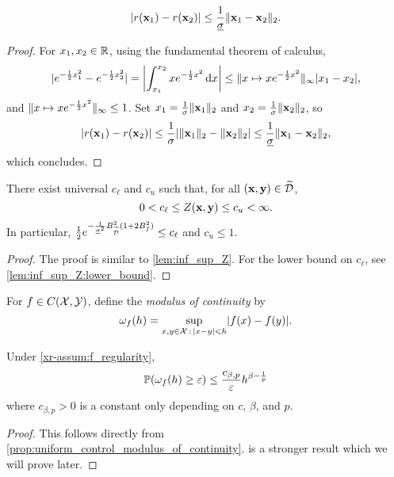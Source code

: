 \documentclass[12pt, twoside]{report}
\newcommand{\xrprefix}[1]{xr-#1}
\begin{document}
\begin{lemma} \label{lem:local_Lipschitzness_r}
    \begin{equation}
        \abs{r(\vx_1) - r(\vx_2)} \le \frac{1}{\underline{\sigma}}\norm{\vx_1 - \vx_2}_2.
    \end{equation}
\end{lemma}
\begin{proof}
    For $x_1, x_2 \in \R$, using the fundamental theorem of calculus,
    \begin{equation}
        \abs{e^{-\frac12 x_1^2} - e^{-\frac12 x_2^2}} = \abs*{
            \int_{x_1}^{x_2} x e^{-\frac12 x^2} \isd x
        }
        \le \norm{x \mapsto x e^{-\frac12 x^2}}_\infty \abs{x_1 - x_2},
    \end{equation}
    and $\norm{x \mapsto x e^{-\frac12 x^2}}_\infty \le 1$.
    Set $x_1 = \frac1{\sigma}\norm{\vx_1}_2$ and $x_2 = \frac1{\sigma}\norm{\vx_2}_2$,
    so
    \begin{equation}
        \abs{r(\vx_1) - r(\vx_2)}
        \le \frac{1}{\sigma} \abs{\norm{\vx_1}_2 - \norm{\vx_2}_2}
        \le \frac{1}{\underline{\sigma}} \norm{\vx_1 - \vx_2}_2,
    \end{equation}
    which concludes.  
\end{proof}

\begin{lemma} \label{lem:bounds_Z}
    There exist universal $c_\ell$ and $c_u$ such that, for all $(\vx, \vy) \in \tD$,
    \begin{equation}
        0
        < c_\ell
        \le Z(\vx, \vy)
        \le c_u
        < \infty.
    \end{equation}
    In particular, $\frac12 e^{-\frac{1}{\underline{\sigma}^2} B_{\tD}^2 (1 + 2 B_f^2)} \le c_\ell$ and $c_u \le 1$.
\end{lemma}
\begin{proof}
    The proof is similar to \cref{lem:inf_sup_Z}.
    For the lower bound on $c_\ell$, see \eqref{lem:inf_sup_Z:lower_bound}.
\end{proof}

For $f \in C(\X, \Y)$, define the \emph{modulus of continuity} by
\begin{equation}
    \omega_f(h)
    = \sup_{x, y \in \X \,:\, \abs{x - y} < h} \abs{f(x) - f(y)}.
\end{equation}

\begin{proposition}
    Under \cref{\xrprefix{assum:f_regularity}},
    \begin{equation}
        \P(\omega_f(h) \ge \e) \le \frac{c_{\beta, p}}{\e} h^{\beta - \frac{1}{p}}
    \end{equation}
    where $c_{\beta, p} > 0$ is a constant only depending on $c$, $\beta$, and $p$.
\end{proposition}
\begin{proof}
    This follows directly from \cref{prop:uniform_control_modulus_of_continuity}.
     is a stronger result which we will prove later.
\end{proof}
\end{document}
